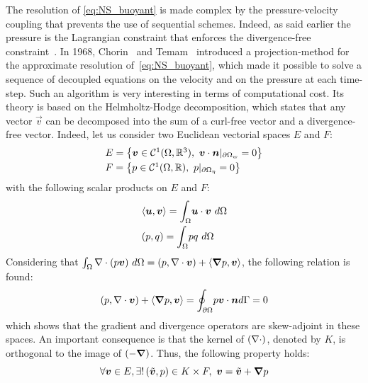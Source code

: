 The resolution of \eqref{eq:NS_buoyant} is made complex by the pressure-velocity coupling that prevents the use of sequential schemes.
Indeed, as said earlier the pressure is the Lagrangian constraint that enforces the divergence-free constraint~\cite{Aris1962}.
In 1968, Chorin~\cite{Chorin1968} and Temam~\cite{Temam1968} introduced a projection-method for the approximate resolution of~\eqref{eq:NS_buoyant}, which made it
possible to solve a sequence of decoupled equations on the velocity and on the pressure at each time-step.
Such an algorithm is very interesting in terms of computational cost.
Its theory is based on the Helmholtz-Hodge decomposition, which states that any vector $\vec v$ can be decomposed into the sum of a curl-free vector and a divergence-free vector.
Indeed, let us consider two Euclidean vectorial spaces $E$ and $F$:
\begin{equation}
  \begin{array}{l}
    E = \left\{ \vec{v} \in \mathcal{C}^1(\Omega, \mathbb R^3), ~ \vec v \cdot \vec n|_{\partial \Omega_w}=0\right\} \smallskip\\
    F = \left\{ p \in \mathcal{C}^1(\Omega, \mathbb R), ~ p|_{\partial \Omega_\eta}=0\right\} \\
  \end{array}
\end{equation}
with the following scalar products on $E$ and $F$:
\begin{equation}
  \begin{array}{l}
    \langle \vec u , \vec v \rangle = \displaystyle{\int_\Omega} \vec u \cdot \vec v~d\Omega \smallskip\\
    (p,q) = \displaystyle{\int_\Omega} pq~d\Omega
  \end{array}
\end{equation}
Considering that $\int_\Omega \nabla \cdot (p\bm{v})~d\Omega = (p, \nabla \cdot \bm{v}) + \langle \bm{\nabla} p , \bm{v} \rangle$, the following relation is found:
\begin{equation}
  (p, \nabla \cdot \bm{v}) + \langle \bm{\nabla} p , \bm{v} \rangle = \displaystyle{\oint_{\partial \Omega}}p \bm{v} \cdot \bm{n} d\Gamma = 0
\end{equation}
which shows that the gradient and divergence operators are skew-adjoint in these spaces.
An important consequence is that the kernel of $(\nabla \cdot)$, denoted by $K$, is orthogonal to the image of $(-\bm{\nabla})$.
Thus, the following property holds:
\begin{equation}
  \forall \bm{v} \in E, \exists ! \left(\tilde {\bm{v}}, p \right) \in K \times F, ~ \bm{v} = \tilde {\bm{v}} + \bm{\nabla} p
\end{equation}
